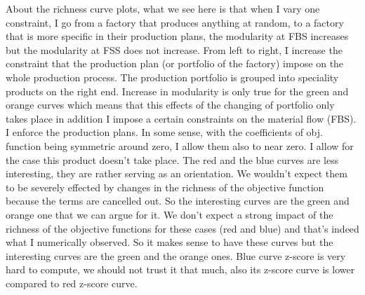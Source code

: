 {	About the richness curve plots, what we see here is that when I vary one constraint, I go from a factory that produces anything at random, to a factory that is more specific in their production plans, the modularity at FBS increases but the modularity at FSS does not increase. From left to right, I increase the constraint that the production plan (or portfolio of the factory) impose on the whole production process. The production portfolio is grouped into speciality products on the right end. Increase in modularity is only true for the green and orange curves which means that this effects of the changing of portfolio only takes place in addition I impose a certain constraints on the material flow (FBS). I enforce the production plans. In some sense, with the coefficients of obj. function being symmetric around zero, I allow them also to near zero. I allow for the case this product doesn't take place. The red and the blue curves are less interesting, they are rather serving as an orientation. We wouldn't expect them to be severely effected by changes in the richness of the objective function because the terms are cancelled out. So the interesting curves are the green and orange one that we can argue for it. We don't expect a strong impact of the richness of the objective functions for these cases (red and blue) and that's indeed what I numerically observed. So it makes sense to have these curves but the interesting curves are the green and the orange ones.
	Blue curve z-score is very hard to compute, we should not trust it that much, also its z-score curve is lower compared to red z-score curve. 
}







